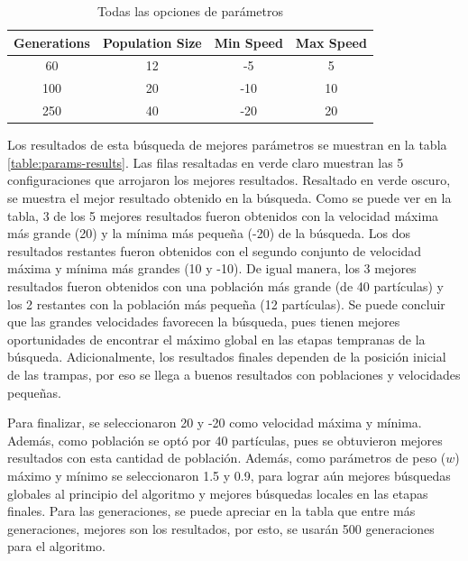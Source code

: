\documentclass[letterpaper]{report}
\begin{document}
    \begin{table}[ht!]
      \caption{Todas las opciones de parámetros}
      \begin{center}
        \begin{tabular}{|c|c|c|c|}
          \hline
          Generations & Population Size & Min Speed & Max Speed \\
          \hline
          60 & 12 & -5 & 5 \\
          \hline
          100 & 20 & -10 & 10 \\
          \hline
          250 & 40 & -20 & 20 \\
          \hline
        \end{tabular}
        \label{table:params-options}
      \end{center}
    \end{table}

    Los resultados de esta búsqueda de mejores parámetros se muestran en la
    tabla \ref{table:params-results}. Las filas resaltadas en verde claro
    muestran las 5 configuraciones que arrojaron los mejores resultados.
    Resaltado en verde oscuro, se muestra el mejor resultado obtenido en la
    búsqueda. Como se puede ver en la tabla, 3 de los 5 mejores resultados
    fueron obtenidos con la velocidad máxima más grande (20) y la mínima más
    pequeña (-20) de la búsqueda. Los dos resultados restantes fueron obtenidos
    con el segundo conjunto de velocidad máxima y mínima más grandes (10 y -10).
    De igual manera, los 3 mejores resultados fueron obtenidos con una población
    más grande (de 40 partículas) y los 2 restantes con la población más pequeña
    (12 partículas). Se puede concluir que las grandes velocidades favorecen la
    búsqueda, pues tienen mejores oportunidades de encontrar el máximo global en
    las etapas tempranas de la búsqueda. Adicionalmente, los resultados finales
    dependen de la posición inicial de las trampas, por eso se llega a buenos
    resultados con poblaciones y velocidades pequeñas. 

    Para finalizar, se seleccionaron 20 y -20 como velocidad máxima
    y mínima. Además, como población se optó por 40 partículas, pues se
    obtuvieron mejores resultados con esta cantidad de población.
    Además, como parámetros de peso ($w$) máximo y mínimo se seleccionaron 1.5 y
    0.9, para lograr aún mejores búsquedas globales al principio del algoritmo y
    mejores búsquedas locales en las etapas finales. Para las generaciones, se
    puede apreciar en la tabla que entre más generaciones, mejores son los
    resultados, por esto, se usarán 500 generaciones para el algoritmo.
    
\end{document}
